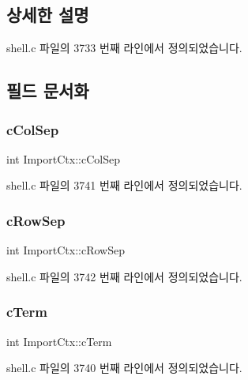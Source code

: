 \subsection{상세한 설명}


shell.\+c 파일의 3733 번째 라인에서 정의되었습니다.



\subsection{필드 문서화}
\mbox{\label{struct_import_ctx_a5c5dc07e3bd063d2da26da4a83f46576}} 
\subsubsection{\texorpdfstring{c\+Col\+Sep}{cColSep}}
{\footnotesize\ttfamily int Import\+Ctx\+::c\+Col\+Sep}



shell.\+c 파일의 3741 번째 라인에서 정의되었습니다.

\mbox{\label{struct_import_ctx_a9b23999b41777a9726b91ec61b74f21a}} 
\subsubsection{\texorpdfstring{c\+Row\+Sep}{cRowSep}}
{\footnotesize\ttfamily int Import\+Ctx\+::c\+Row\+Sep}



shell.\+c 파일의 3742 번째 라인에서 정의되었습니다.

\mbox{\label{struct_import_ctx_a32c66d4ff064ed9d5775ec6a0bab66ba}} 
\subsubsection{\texorpdfstring{c\+Term}{cTerm}}
{\footnotesize\ttfamily int Import\+Ctx\+::c\+Term}



shell.\+c 파일의 3740 번째 라인에서 정의되었습니다.

